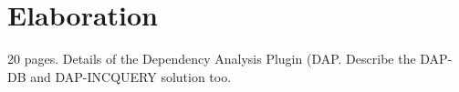 \chapter{Elaboration}
20 pages. Details of the Dependency Analysis Plugin (DAP. Describe the DAP-DB and DAP-INCQUERY solution too. 
